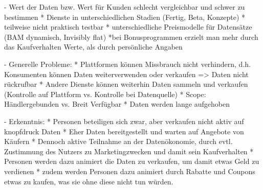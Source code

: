 - Wert der Daten bzw. Wert für Kunden schlecht vergleichbar und schwer zu bestimmen
    * Dienste in unterschiedlichen Stadien (Fertig, Beta, Konzepte)
    * teilweise nicht praktisch testbar
    * unterschiedliche Preismodelle für Datensätze (BAM dynamisch, Invisibly flat)
    *bei Bonusprogrammen erzielt man mehr durch das Kaufverhalten Werte, als durch persönliche Angaben

- Generelle Probleme:
    * Plattformen können Missbrauch nicht verhindern, d.h. Konsumenten können Daten weiterverwenden oder verkaufen => Daten nicht rückrufbar
    * Andere Dienste können weiterhin Daten sammeln und verkaufen (Kontrolle auf Plattform vs. Kontrolle bei Datenquelle)
    * Scope: Händlergebunden vs. Breit Verfügbar
    * Daten werden lange aufgehoben

- Erkenntnis:
    * Personen beteiligen sich zwar, aber verkaufen nicht aktiv auf knopfdruck Daten
    * Eher Daten bereitgestellt und warten auf Angebote von Käufern
    * Dennoch aktive Teilnahme an der Datenökonomie, durch evtl. Zustimmung des Nutzers zu Marketingzwecken und damit sein Kaufverhalten
    * Personen werden dazu animiert die Daten zu verkaufen, um damit etwas Geld zu verdienen
    * zudem werden Personen dazu animiert durch Rabatte und Coupons etwas zu kaufen, was sie ohne diese nicht tun würden.
